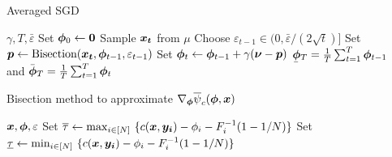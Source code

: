 \documentclass[11pt, a4paper, oneside, reqno]{article}
\begin{document}
	\begin{table}[!b]
		\centering
		\begin{minipage}{0.375\textwidth}
			\vspace{-1em}
			\begin{algorithm}[H]
				\caption{\label{algorithm:asgd}Averaged SGD \protect\phantom{$\nabla_{\bs \phi} \overline\psi$}}
				\begin{algorithmic}[1]
					\Require $\gamma, T, \bar \varepsilon$
					\vspace{0.05em}
					\State Set $\boldsymbol \phi_0 \gets \boldsymbol 0$
					\State \hspace{-1ex}Sample $\boldsymbol {x_t}$ from $\mu$
					\State \hspace{-1ex}Choose $\varepsilon_{t-1} \in (0, \bar \varepsilon / (2 \sqrt{t})]$
					\State \hspace{-1ex}Set $ \boldsymbol p \gets \text{Bisection}(\boldsymbol {x_t}, \boldsymbol \phi_{t-1}, \varepsilon_{t-1})$
					\State \hspace{-1ex}Set $\boldsymbol \phi_t \leftarrow \boldsymbol \phi_{t-1} + \gamma (\boldsymbol \nu - \boldsymbol p)$
					\EndFor
					\vspace{0.05em}
					\Ensure $\ubar{\bs \phi}_T = \frac{1}{T}\sum_{t=1}^T \bs \phi_{t-1}$~ and \phantom{abcd} \phantom{abcd}\hspace{0.85ex} $\bar{\boldsymbol \phi}_T = \frac{1}{T}\sum_{t=1}^T \boldsymbol \phi_{t}$
				\end{algorithmic}
			\end{algorithm}
			\vspace{-1em}
		\end{minipage} 
		\begin{minipage}{0.6175\textwidth}
		    \vspace{-1em}
			\begin{algorithm}[H]				\caption{\label{algorithm:bisection}Bisection method to approximate $\nabla_{\boldsymbol \phi} \overline\psi_c(\boldsymbol \phi, \boldsymbol x)$}
				\begin{algorithmic}[1]
					\Require $\boldsymbol x, \boldsymbol \phi, \varepsilon$ \vspace{0.1em}
					\State Set $\overline{\tau} \gets \max_{i \in [N]} ~ \{c(\boldsymbol x,\boldsymbol {y_i}) - \phi_i - F_i^{-1}(1-1/N) \}$
					\State Set $\underline{\tau} \gets \min_{i \in [N]} ~ \{c(\boldsymbol x,\boldsymbol {y_i}) - \phi_i - F_i^{-1}(1-1/N) \}$

\end{algorithmic}
\end{algorithm}
\end{minipage}
\end{table}
\end{document}
